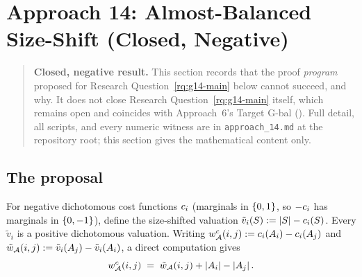 \section{Approach 14: Almost-Balanced Size-Shift (Closed, Negative)}
\label{sec:approach14}

\begin{quote}
\textbf{Closed, negative result.} This section records that the proof
\emph{program} proposed for Research Question~\ref{rq:g14-main} below cannot
succeed, and why. It does not close Research Question~\ref{rq:g14-main}
itself, which remains open and coincides with Approach~6's Target G-bal
(). Full detail, all scripts, and every numeric witness
are in \texttt{approach\_14.md} at the repository root; this section gives
the mathematical content only.
\end{quote}

\subsection{The proposal}
\label{sec:g14-setup}

For negative dichotomous cost functions $c_i$ (marginals in $\left\{0,1\right\}$,
so $-c_i$ has marginals in $\left\{0,-1\right\}$), define the size-shifted
valuation $\tilde v_i(S) := \left\lvert S\right\rvert - c_i(S)$. Every $\tilde v_i$ is a
positive dichotomous valuation. Writing
$w^{c}_{\mathcal{A}}(i,j) := c_i(A_{i}) - c_i(A_{j})$ and
$\tilde w_{\mathcal{A}}(i,j) := \tilde v_i(A_{j}) - \tilde v_i(A_{i})$, a
direct computation gives
\begin{equation}
\label{eq:g14-shift}
  w^{c}_{\mathcal{A}}(i,j) \;=\; \tilde w_{\mathcal{A}}(i,j) + \left\lvert A_{i}\right\rvert - \left\lvert A_{j}\right\rvert.
\end{equation}

